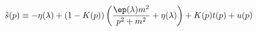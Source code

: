 \begin{equation}
\tilde{s} (p) \equiv - \eta(\lambda) + (1 - K(p)) \left( \frac{\ep(\lambda)
m^2}{p^2 + m^2} + \eta (\lambda) \right) + K(p) t(p) + u(p)
\end{equation}

